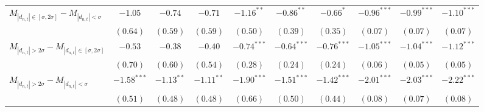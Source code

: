 \begin{tabular}{lccccccccc}
 \hline$M_{|d_{n,t}| \in [\sigma, 2\sigma]} - M_{|d_{n,t}| < \sigma}$ & $-1.05$ & $-0.74$ & $-0.71$ & $-1.16^{**}$ & $-0.86^{**}$ & $-0.66^{*}$ & $-0.96^{***}$ & $-0.99^{***}$ & $-1.10^{***}$ \\ 
   & $(0.64)$ & $(0.59)$ & $(0.59)$ & $(0.50)$ & $(0.39)$ & $(0.35)$ & $(0.07)$ & $(0.07)$ & $(0.07)$ \\ 
  $M_{|d_{n,t}| > 2 \sigma} - M_{|d_{n,t}| \in [\sigma, 2\sigma]}$ & $-0.53$ & $-0.38$ & $-0.40$ & $-0.74^{***}$ & $-0.64^{***}$ & $-0.76^{***}$ & $-1.05^{***}$ & $-1.04^{***}$ & $-1.12^{***}$ \\ 
   & $(0.70)$ & $(0.60)$ & $(0.54)$ & $(0.28)$ & $(0.24)$ & $(0.24)$ & $(0.06)$ & $(0.05)$ & $(0.05)$ \\ 
  $M_{|d_{n,t}| > 2 \sigma} - M_{|d_{n,t}| < \sigma}$ & $-1.58^{***}$ & $-1.13^{**}$ & $-1.11^{**}$ & $-1.90^{***}$ & $-1.51^{***}$ & $-1.42^{***}$ & $-2.01^{***}$ & $-2.03^{***}$ & $-2.22^{***}$ \\ 
   & $(0.51)$ & $(0.48)$ & $(0.48)$ & $(0.66)$ & $(0.50)$ & $(0.44)$ & $(0.08)$ & $(0.07)$ & $(0.08)$ \\ 
   \hline 
\end{tabular}
